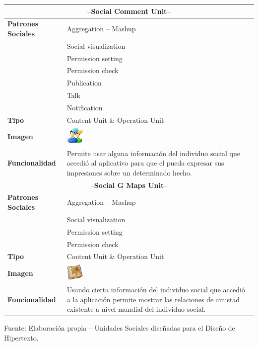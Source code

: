 \documentclass[oneside,12pt,a4paper]{memoir}%
\begin{document}
\begin{table}[htbp]
\begin{tabular}{|l|p{12cm}|}
			\multicolumn{2}{|c|}{--\textbf{Social Comment Unit}--}					\\\hline 
			\textbf{Patrones Sociales}	&	Aggregation -- Mashup					\\
										&	Social visualization					\\
										&	Permission setting						\\
										&	Permission check						\\
										&	Publication								\\
										&	Talk									\\
										&	Notification							\\\hline 
			\textbf{Tipo}				&	Content Unit \& Operation Unit			\\\hline
			\textbf{Imagen} & \includegraphics{units/SocialCommentUnit.png}			\\\hline 
			\textbf{Funcionalidad}		&	Permite usar alguna informaci\'on del individuo
			social que accedi\'o al aplicativo para que el pueda expresar sus
			impresiones sobre un determinado hecho.									\\\hline
			
			\multicolumn{2}{|c|}{--\textbf{Social G Maps Unit}--}					\\\hline 
			\textbf{Patrones Sociales}	&	Aggregation -- Mashup					\\
										&	Social visualization					\\
										&	Permission setting						\\
										&	Permission check						\\\hline 
			\textbf{Tipo}				&	Content Unit \& Operation Unit			\\\hline 
			\textbf{Imagen} & \includegraphics{units/SocialGMapsUnit.png}			\\\hline
			\textbf{Funcionalidad}		&	Usando cierta informaci\'on del individuo social
			que accedi\'o a la aplicaci\'on permite mostrar las relaciones de amistad
			existente a nivel mundial del individuo social.							\\\hline
		\end{tabular}
	\newline
	Fuente: Elaboraci\'on propia -- Unidades Sociales dise\~nadas para el
	Dise\~no de Hipertexto.
	\label{tab:customUnits}
	\end{table}
			
\end{document}
